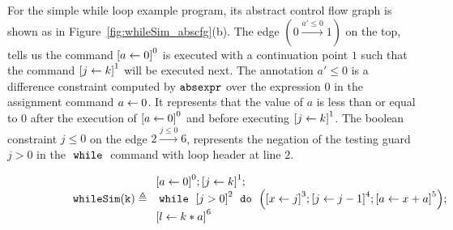 \begin{example}
  \label{ex:whileSim_abscfg}
    For the simple while loop example program, 
its abstract control flow graph is shown as in Figure~\ref{fig:whileSim_abscfg}(b).
The edge $(0 \xrightarrow{a' \leq 0} 1)$ on the top, tells us the command 
$\clabel{\assign{a}{0}}^0$ is executed with a continuation point $1$ such that the
command $\clabel{\assign{j}{k}}^1$ will be executed next.
The annotation $a' \leq 0$ is a difference constraint 
computed by $\mathtt{abs}{\mathtt{expr}}$ over
the expression $0$ in the assignment command $\mathrel{ a \leftarrow 0 }$.
It represents that the value of $a$ is less than or equal to $0$ after the
execution of $\clabel{\assign{a}{0}}^0$ and before executing $\clabel{\assign{j}{k}}^1$.
The boolean constraint $j \leq 0 $ on the edge $2 \xrightarrow{j \leq 0} 6$, 
represents the negation of the testing guard $j > 0$
in the $\;\mathtt{while}\;$ command with loop header at line $2$.
%
\begin{figure} 
  \centering
  \begin{subfigure}{.7\textwidth}
  \begin{centering}
  {\small
  $
  \kw{whileSim(k)} \triangleq
    \begin{array}{l}
        \clabel{ \assign{a}{0}}^{0} ;   
              \clabel{\assign{j}{k} }^{1} ;\\
              \ewhile ~ \clabel{j > 0}^{2} ~ \edo ~ 
              \Big(
               \clabel{\assign{x}{j} }^{3}  ;
               \clabel{\assign{j}{j-1}}^{4} ;
              \clabel{\assign{a}{x + a}}^{5}  \Big);\\
              \clabel{\assign{l}{k * a} }^{6}
          \end{array}
  $
  }
  \caption{}

\end{centering}
\end{subfigure}
\end{figure}
\end{example}
